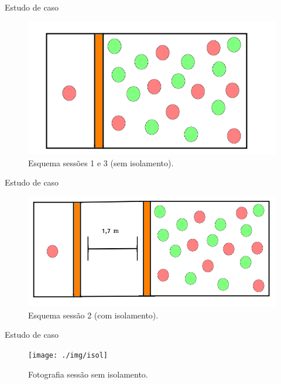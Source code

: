\documentclass[
  ignorenonframetext,
  serif,
  professionalfont,
  usenames,
  dvipsnames,
  aspectratio = 169]{beamer}
\begin{document}
\begin{frame}{Estudo de caso}
\protect\hypertarget{estudo-de-caso-4}{}
\begin{figure}

{\centering \includegraphics[width=0.7\linewidth]{./img/se1_se3} 

}

\caption{Esquema sessões 1 e 3 (sem isolamento).}\label{fig:unnamed-chunk-5}
\end{figure}
\end{frame}

\begin{frame}{Estudo de caso}
\protect\hypertarget{estudo-de-caso-5}{}
\begin{figure}

{\centering \includegraphics[width=0.7\linewidth]{./img/se2} 

}

\caption{Esquema sessão 2 (com isolamento).}\label{fig:unnamed-chunk-6}
\end{figure}
\end{frame}

\begin{frame}{Estudo de caso}
\protect\hypertarget{estudo-de-caso-6}{}
\begin{figure}

{\centering \texttt{[image: ./img/isol]} 

}

\caption{Fotografia sessão sem isolamento.}\label{fig:unnamed-chunk-7}
\end{figure}
\end{frame}
\end{document}
